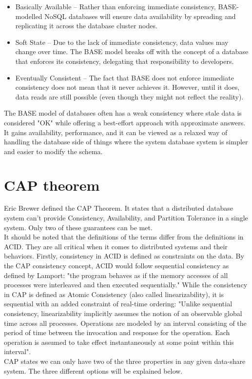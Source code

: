 \documentclass[a4paper,10pt,titlepage]{report}
\begin{document}
    \begin{itemize}
        \item Basically Available – Rather than enforcing immediate consistency, BASE-modelled NoSQL databases will ensure data availability by spreading and replicating it across the database cluster nodes.
        \item Soft State – Due to the lack of immediate consistency, data values may change over time. The BASE model breaks off with the concept of a database that enforces its consistency, delegating that responsibility to developers.
        \item Eventually Consistent – The fact that BASE does not enforce immediate consistency does not mean that it never achieves it. However, until it does, data reads are still possible (even though they might not reflect the reality).
    \end{itemize}

    The BASE model of databases often has a weak consistency where stale data is considered "OK" while offering a best-effort approach with approximate answers. It gains availability, performance, and it can be viewed as a relaxed way of handling the database side of things where the system database system is simpler and easier to modify the schema.


    \section{CAP theorem}

    Eric Brewer defined the CAP Theorem\cite{CAP}. It states that a distributed database system can't provide Consistency, Availability, and Partition Tolerance in a single system. Only two of these guarantees can be met.\\
    \vspace{5mm}
    It should be noted that the definitions of the terms differ from the definitions in ACID. They are all critical when it comes to distributed systems and their behaviors. Firstly, consistency in ACID is defined as constraints on the data. By the CAP consistency concept, ACID would follow sequential consistency as defined by Lamport\cite{lamport1993how}: "the program behaves as if the memory accesses of all processes were interleaved and then executed sequentially." While the consistency in CAP is defined as Atomic Consistency (also called linearizability), it is sequential with an added constraint of real-time ordering: "Unlike sequential consistency, linearizability implicitly assumes the notion of an observable global time across all processes. Operations are modeled by an interval consisting of the period of time between the invocation and response for the operation. Each operation is assumed to take effect instantaneously at some point within this interval". \cite{CSL-TR-95-685} \\
    \vspace{5mm}
    CAP states we can only have two of the three properties in any given data-share system. The three different options will be explained below.
\end{document}
